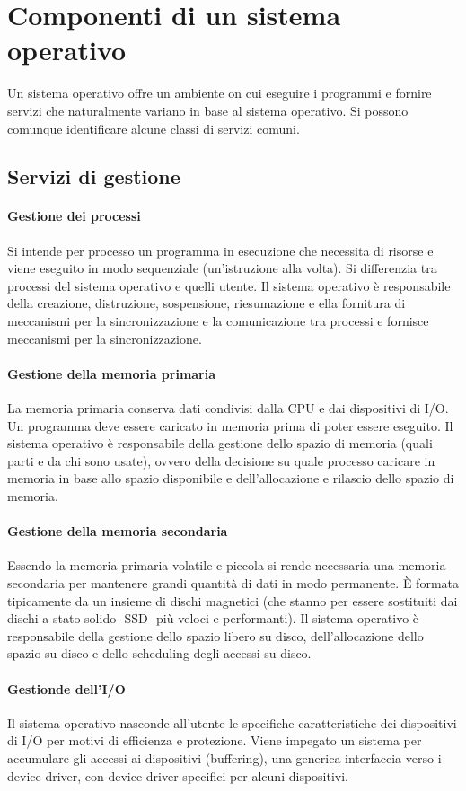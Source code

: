\chapter{Componenti di un sistema operativo}
Un sistema operativo offre un ambiente on cui eseguire i programmi e fornire servizi che naturalmente variano in base al sistema operativo. Si possono comunque identificare alcune classi di servizi comuni.
\section{Servizi di gestione}
\subsubsection{Gestione dei processi}
Si intende per processo un programma in esecuzione che necessita di risorse e viene eseguito in modo sequenziale (un'istruzione alla volta). Si differenzia tra processi del sistema operativo e quelli utente. Il 
sistema operativo \`e responsabile della creazione, distruzione, sospensione, riesumazione e ella fornitura di meccanismi per la sincronizzazione e la comunicazione tra processi e fornisce meccanismi per la sincronizzazione. 
\subsubsection{Gestione della memoria primaria}
La memoria primaria conserva dati condivisi dalla CPU e dai dispositivi di I/O. Un programma deve essere caricato in memoria prima di poter essere eseguito. Il sistema operativo \`e responsabile della gestione 
dello spazio di memoria (quali parti e da chi sono usate), ovvero della decisione su quale processo caricare in memoria in base allo spazio disponibile e dell'allocazione e rilascio dello spazio di memoria. 
\subsubsection{Gestione della memoria secondaria}
Essendo la memoria primaria volatile e piccola si rende necessaria una memoria secondaria per mantenere grandi quantit\`a di dati in modo permanente. \`E formata tipicamente da un insieme di dischi 
magnetici (che stanno per essere sostituiti dai dischi a stato solido -SSD- pi\`u veloci e performanti). Il sistema operativo \`e responsabile della gestione dello spazio libero su disco, dell'allocazione dello spazio su disco e 
dello scheduling degli accessi su disco. 
\subsubsection{Gestionde dell'I/O}
Il sistema operativo nasconde all'utente le specifiche caratteristiche dei dispositivi di I/O per motivi di efficienza e protezione. Viene impegato un sistema per accumulare gli accessi ai dispositivi (buffering), una generica 
interfaccia verso i device driver, con device driver specifici per alcuni dispositivi. 
